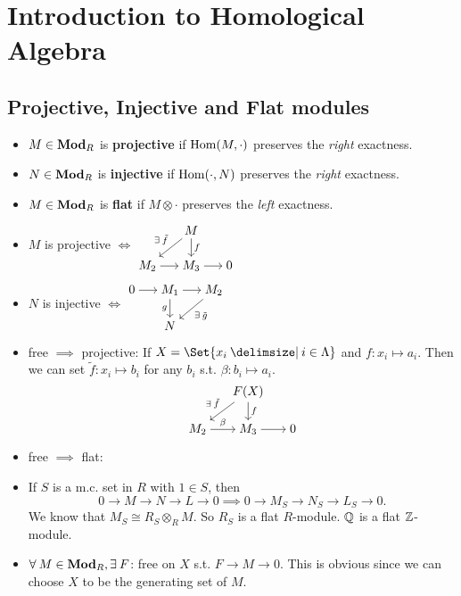 \section{Introduction to Homological Algebra}

\subsection{Projective, Injective and Flat modules}

\begin{definition} \mbox{}
  \begin{itemize}
    \item $M \in \mathbf{Mod}_R$ is {\bf projective} if $\operatorname{Hom}(M, \cdot)$ preserves the
      {\it right} exactness.
    \item $N \in \mathbf{Mod}_R$ is {\bf injective} if $\operatorname{Hom}(\cdot, N)$ preserves the
      {\it right} exactness.
    \item $M \in \mathbf{Mod}_R$ is {\bf flat} if $M\otimes \cdot$ preserves the
      {\it left} exactness.
  \end{itemize}
\end{definition}

\begin{fact} \mbox{}
  \begin{itemize}
    \item $M$ is projective $\iff$
      $\begin{tikzcd}[cramped, sep=15pt]
         & M \ar[dl, "\exists \tilde f"'] \ar[d, "f"] \\
        M_2 \ar[r] & M_3 \ar[r] & 0
      \end{tikzcd}$
    \item $N$ is injective $\iff$
      $\begin{tikzcd}[cramped, sep=15pt]
        0 \ar[r] & M_1 \ar[d, "g"'] \ar[r] & M_2 \ar[dl, "\exists \tilde g"] \\
         & N
      \end{tikzcd}$
    \item free $\implies$ projective:
      If $X = \Set{ x_i \given i \in \Lambda}$ and $f: x_i \mapsto a_i$. Then
      we can set $\tilde f: x_i \mapsto b_i$ for any $b_i$ s.t.
      $\beta: b_i \mapsto a_i$.
      \[\begin{tikzcd}[cramped, sep=15pt]
        & F(X) \ar[dl, "\exists \tilde f"'] \ar[d, "f"] \\
        M_2 \ar[r, "\beta"] & M_3 \ar[r] & 0
      \end{tikzcd}\]
    \item free $\implies$ flat:
    \item If $S$ is a m.c. set in $R$ with $1 \in S$, then
      \[ 0 \to M \to N \to L \to 0 \implies 0 \to M_S \to N_S \to L_S \to 0. \]
      We know that $M_S \cong R_S \otimes_R M$. So $R_S$ is a flat $R$-module.
      $\mathbb{Q}$ is a flat $\mathbb{Z}$-module.
    \item $\forall M \in \Mod_R, \exists F$: free on $X$ s.t. $F \to M \to 0$.
      This is obvious since we can choose $X$ to be the generating set of $M$.
  \end{itemize}
\end{fact}


